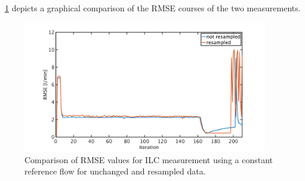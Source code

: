 \figurename~\ref{fig:RMSE_ilc_var_dist_comp_const} depicts a graphical comparison of the RMSE courses of the two measurements.
\begin{figure}[ht!]
  \centering
  \includegraphics[width=0.95\textwidth]{images/chapt_5/ILC/RMSE_ilc_var_dist_comp_const.pdf}
  \caption[Comparison of RMSE values for ILC measurement using a constant reference flow for unchanged and resampled data]{Comparison of RMSE values for ILC measurement using a constant reference flow for unchanged and resampled data.}
  \label{fig:RMSE_ilc_var_dist_comp_const}
\end{figure}



